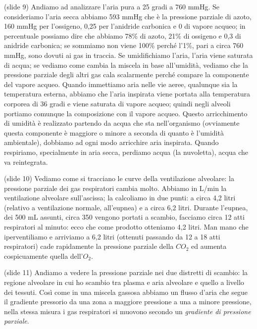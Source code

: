 \documentclass[a4paper,12pt]{article}
\begin{document}
(slide 9) Andiamo ad analizzare l'aria pura a 25 gradi a 760 mmHg. Se consideriamo l'aria secca abbiamo 593 mmHg che è la pressione parziale di azoto, 160 mmHg per l'ossigeno, 0,25 per l'anidride carbonica e 0 di vapore acqueo; in percentuale possiamo dire che abbiamo 78\% di azoto, 21\% di ossigeno e 0,3 di anidride carbonica; se sommiamo non viene 100\% perché l'1\%, pari a circa 760 mmHg, sono dovuti ai gas in traccia. Se umidifichiamo l'aria, l'aria viene saturata di acqua; se vediamo come cambia la miscela in base all'umidità, vediamo che la pressione parziale degli altri gas cala scalarmente perché compare la componente del vapore acqueo. Quando immettiamo aria nelle vie aeree, qualunque sia la temperatura esterna, abbiamo che l'aria inspirata viene portata alla temperatura corporea di 36 gradi e viene saturata di vapore acqueo; quindi negli alveoli portiamo comunque la composizione con il vapore acqueo. Questo arricchimento di umidità è realizzato partendo da acqua che sta nell'organismo (ovviamente questa componente è maggiore o minore a seconda di quanto è l'umidità ambientale), dobbiamo ad ogni modo arricchire aria inspirata. Quando respiriamo, specialmente in aria secca, perdiamo acqua (la nuvoletta), acqua che va reintegrata. 

(slide 10) Vediamo come si tracciano le curve della ventilazione alveolare: la pressione parziale dei gas respiratori cambia molto. Abbiamo in L/min la ventilazione alveolare sull'ascissa; la calcoliamo in due punti: a circa 4,2 litri (relativo a ventilazione normale, all'eupnea) e a circa 6,2 litri. Durante l'eupnea, dei 500 mL assunti, circa 350 vengono portati a scambio, facciamo circa 12 atti respiratori al minuto: ecco che come prodotto otteniamo 4,2 litri. Man mano che iperventiliamo e arriviamo a 6,2 litri (ottenuti passando da 12 a 18 atti respiratori) cade rapidamente la pressione parziale della $CO_{2}$ ed aumenta cospicuamente quella dell'$O_{2}$.

(slide 11) Andiamo a vedere la pressione parziale nei due distretti di scambio: la regione alveolare in cui ho scambio tra plasma e aria alveolare e quello a livello dei tessuti. Così come in una miscela gassosa abbiamo un flusso d'aria che segue il gradiente pressorio da una zona a maggiore pressione a una a minore pressione, nella stessa misura i gas respiratori si muovono secondo un \emph{gradiente di pressione parziale}. 
\end{document}
